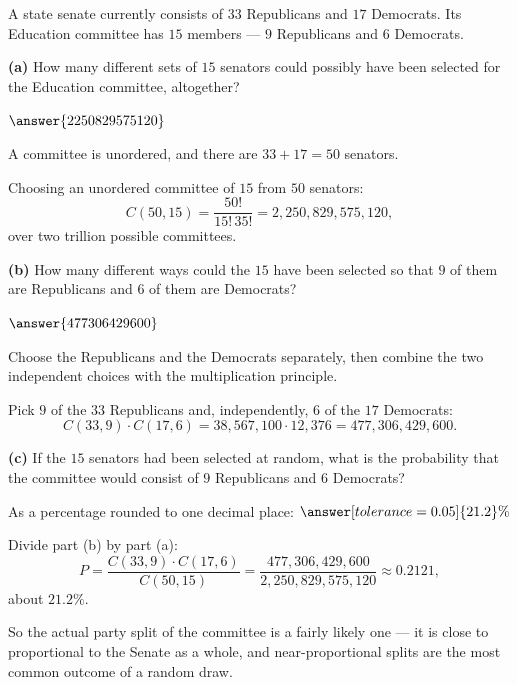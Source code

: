 \documentclass[12pt]{ximera}
\begin{document}
\begin{problem}
A state senate currently consists of $33$ Republicans and $17$ Democrats. Its
Education committee has $15$ members --- $9$ Republicans and $6$ Democrats.

\begin{prompt}
\textbf{(a)} How many different sets of $15$ senators could possibly have been selected
for the Education committee, altogether?

$\answer{2250829575120}$

\begin{hint}
A committee is unordered, and there are $33+17=50$ senators.
\end{hint}

\begin{feedback}
Choosing an unordered committee of $15$ from $50$ senators:
\[
C(50,15)=\frac{50!}{15!\,35!}=2{,}250{,}829{,}575{,}120,
\]
over two trillion possible committees.
\end{feedback}
\end{prompt}

\begin{prompt}
\textbf{(b)} How many different ways could the $15$ have been selected so that $9$ of
them are Republicans and $6$ of them are Democrats?

$\answer{477306429600}$

\begin{hint}
Choose the Republicans and the Democrats separately, then combine the two
independent choices with the multiplication principle.
\end{hint}

\begin{feedback}
Pick $9$ of the $33$ Republicans and, independently, $6$ of the $17$ Democrats:
\[
C(33,9)\cdot C(17,6) = 38{,}567{,}100 \cdot 12{,}376 = 477{,}306{,}429{,}600.
\]
\end{feedback}
\end{prompt}

\begin{prompt}
\textbf{(c)} If the $15$ senators had been selected at random, what is the probability
that the committee would consist of $9$ Republicans and $6$ Democrats?

As a percentage rounded to one decimal place: $\answer[tolerance=0.05]{21.2}\%$

\begin{feedback}
Divide part (b) by part (a):
\[
P = \frac{C(33,9)\cdot C(17,6)}{C(50,15)}
  = \frac{477{,}306{,}429{,}600}{2{,}250{,}829{,}575{,}120}
  \approx 0.2121,
\]
about $21.2\%$.

So the actual party split of the committee is a fairly likely one --- it is close to
proportional to the Senate as a whole, and near-proportional splits are the most
common outcome of a random draw.
\end{feedback}
\end{prompt}
\end{problem}
\end{document}
